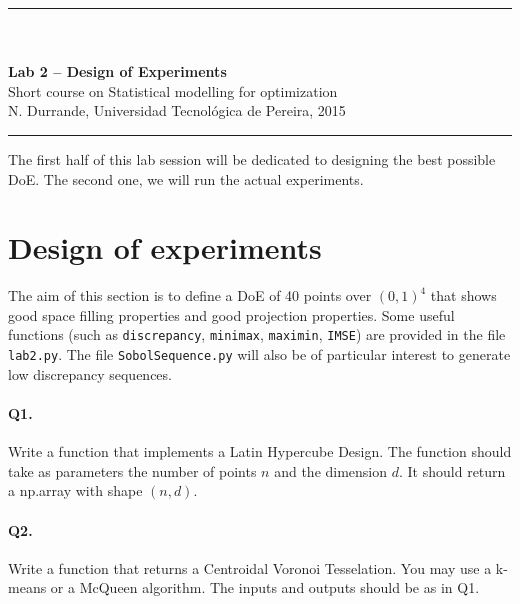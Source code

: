 \documentclass[12pt]{scrartcl}
\begin{document}
\begin{center}
	\rule{\textwidth}{1pt}
	\\ \ \\
	{\LARGE \textbf{Lab 2 -- Design of Experiments}}\\ 
	\vspace{3mm}
	{\large Short course on Statistical modelling for optimization\\ \vspace{3mm}}
	{\normalsize N. Durrande, Universidad Tecnol\'ogica de Pereira, 2015}\\ 
	\vspace{3mm}
	\rule{\textwidth}{1pt}
	\vspace{5mm}
\end{center}
The first half of this lab session will be dedicated to designing the best possible DoE. The second one, we will run the actual experiments. 

\section{Design of experiments}
The aim of this section is to define a DoE of 40 points over $(0,1)^4$ that shows good space filling properties and good projection properties. Some useful functions (such as \texttt{discrepancy}, \texttt{minimax}, \texttt{maximin}, \texttt{IMSE}) are provided in the file \texttt{lab2.py}. The file \texttt{SobolSequence.py} will also be of particular interest to generate low discrepancy sequences. 

\paragraph{Q1.} Write a function that implements a Latin Hypercube Design. The function should take as parameters the number of points $n$ and the dimension $d$. It should return a np.array with shape $(n,d)$.

\paragraph{Q2.} Write a function that returns a Centroidal Voronoi Tesselation. You may use a k-means or a McQueen algorithm. The inputs and outputs should be as in Q1.
\end{document}
